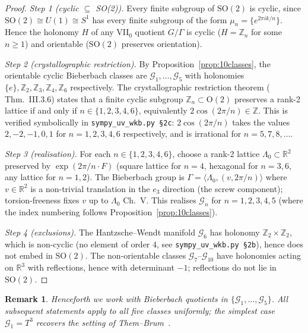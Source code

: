 \documentclass[12pt, a4paper]{article}
\newtheorem{remark}[theorem]{Remark}
\theoremstyle{remark}
\newcommand{\bR}{\mathbb{R}}
\newcommand{\bZ}{\mathbb{Z}}
\begin{document}
\begin{proof}
  \emph{Step 1 (cyclic $\subseteq$ SO(2)).} Every finite subgroup of
  $\mathrm{SO}(2)$ is cyclic, since $\mathrm{SO}(2) \cong U(1) \cong S^1$
  has every finite subgroup of the form $\mu_n = \{e^{2\pi i k/n}\}$.
  Hence the holonomy $H$ of any VII$_0$ quotient $G/\Gamma$ is cyclic
  ($H = \bZ_n$ for some $n \ge 1$) and orientable
  ($\mathrm{SO}(2)$ preserves orientation).

  \emph{Step 2 (crystallographic restriction).}  By
  Proposition~\ref{prop:10classes}, the orientable cyclic Bieberbach
  classes are $\mathcal{G}_1, \dots, \mathcal{G}_5$ with holonomies
  $\{e\}, \bZ_2, \bZ_3, \bZ_4, \bZ_6$ respectively.
  The crystallographic restriction theorem (\cite{Char86} Thm.~III.3.6)
  states that a finite cyclic subgroup $\bZ_n \subset \mathrm{O}(2)$
  preserves a rank-2 lattice if and only if $n \in \{1, 2, 3, 4, 6\}$,
  equivalently $2\cos(2\pi/n) \in \bZ$.
  This is verified symbolically in
  \texttt{sympy\_uv\_wkb.py~\S2c}: $2\cos(2\pi/n)$ takes the values
  $2, -2, -1, 0, 1$ for $n=1,2,3,4,6$ respectively, and is irrational for
  $n=5,7,8,\dots$.

  \emph{Step 3 (realisation).} For each $n \in \{1,2,3,4,6\}$, choose a
  rank-2 lattice $\Lambda_0 \subset \bR^2$ preserved by $\exp(2\pi/n
  \cdot F)$ (square lattice for $n = 4$, hexagonal for $n = 3, 6$, any
  lattice for $n = 1, 2$).
  The Bieberbach group is $\Gamma = \langle \Lambda_0, (v, 2\pi/n)
  \rangle$ where $v \in \bR^2$ is a non-trivial translation in the $e_3$
  direction (the screw component); torsion-freeness fixes $v$ up to
  $\Lambda_0$ \cite{Char86} Ch.~V.
  This realises $\mathcal{G}_n$ for $n = 1,2,3,4,5$ (where the index
  numbering follows Proposition~\ref{prop:10classes}).

  \emph{Step 4 (exclusions).} The Hantzsche--Wendt manifold
  $\mathcal{G}_6$ has holonomy $\bZ_2 \times \bZ_2$, which is non-cyclic
  (no element of order $4$, see \texttt{sympy\_uv\_wkb.py~\S2b}), hence
  does not embed in $\mathrm{SO}(2)$.  The non-orientable classes
  $\mathcal{G}_7$--$\mathcal{G}_{10}$ have holonomies acting on $\bR^3$
  with reflections, hence with determinant $-1$; reflections do not lie
  in $\mathrm{SO}(2)$.
\end{proof}

\begin{remark}\label{rem:scope}
  Henceforth we work with Bieberbach quotients in
  $\{\mathcal{G}_1,\dots,\mathcal{G}_5\}$.  All subsequent statements
  apply to all five classes uniformly; the simplest case
  $\mathcal{G}_1 = T^3$ recovers the setting of Them--Brum~\cite{TB13}.
\end{remark}
\end{document}
